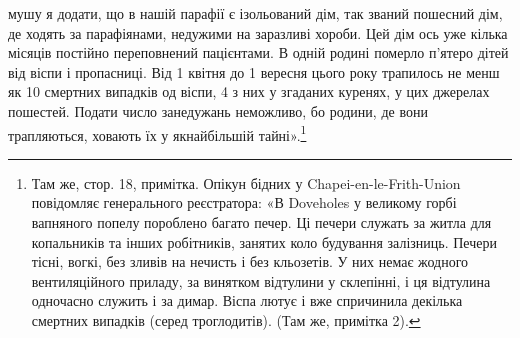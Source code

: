 мушу я додати, що в нашій парафії є ізольований дім, так
званий пошесний дім, де ходять за парафіянами, недужими на
заразливі хороби. Цей дім ось уже кілька місяців постійно переповнений
пацієнтами. В одній родині померло п’ятеро дітей від
віспи і пропасниці. Від 1 квітня до 1 вересня цього року трапилось
не менш як 10 смертних випадків од віспи, 4 з них у згаданих
куренях, у цих джерелах пошестей. Подати число занедужань
неможливо, бо родини, де вони трапляються, ховають їх
у якнайбільшій тайні».\footnote{
Там же, стор. 18, примітка. Опікун бідних у Chapei-en-le-Frith-Union
повідомляє генерального реєстратора: «В Doveholes у великому
горбі вапняного попелу пороблено багато печер. Ці печери служать
за житла для копальників та інших робітників, занятих коло будування
залізниць. Печери тісні, вогкі, без зливів на нечисть і без кльозетів.
У них немає жодного вентиляційного приладу, за винятком відтулини у
склепінні, і ця відтулина одночасно служить і за димар. Віспа лютує і
вже спричинила декілька смертних випадків (серед троглодитів). (Там же,
примітка 2).
}

